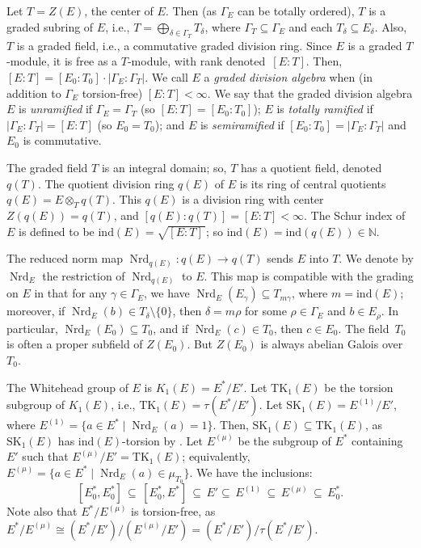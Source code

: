 \documentclass[11pt]{article}
\numberwithin{equation}{section}
\theoremstyle{plain}
\theoremstyle{remark}
\newcommand{\opn}{\operatorname}
\newcommand{\SK}{\opn{SK_1}}
\newcommand{\TK}{\opn{TK_1}}
\newcommand{\Emu}{E^{(\mu)}}
\newcommand{\Eone}{E^{(1)}}
\newcommand{\Nrd}{\opn{Nrd}}
\newcommand{\nn}{\mathbb N}
\begin{document}
Let $T = Z(E)$, the center of $E$. Then (as $\Gamma_E$ can be totally ordered), $T$ is a graded subring of 
$E$, i.e., $T = \bigoplus_{\delta\in \Gamma_T} T_\delta$, where $\Gamma_T \subseteq \Gamma _E$ and 
each $T_\delta \subseteq E_\delta$.  Also, $T$ is a graded field, i.e., a commutative graded division ring.
Since $E$ is a graded $T$-module, it is  free as a $T$-module, with rank denoted~$[E:T]$.   Then, 
$[E:T] = [E_0:T_0] \cdot |\Gamma_E:\Gamma_T|$.  
We call $E$ a {\it{graded division algebra}} when (in addition to $\Gamma_E$ torsion-free) $[E:T] < \infty$.
 We say that the graded division algebra $E$ is {\it{unramified}} if $\Gamma_E = \Gamma_T$ 
 (so $[E:T] = [E_0: T_0]$);  $E$ is {\it{totally ramified}} if $|\Gamma_E:\Gamma_T| = [E:T]$ (so $E_0 = T_0$); and 
$E$ is {\it{semiramified}} if $[E_0: T_0] = |\Gamma_E:\Gamma_T|$ and $E_0$ is commutative. 

The graded
field $T$ is an integral domain;  so, $T$ has a quotient field, denoted $q(T)$. 
The quotient division ring $q(E)$ of $E$ is its ring of central quotients $q(E) = E \otimes _T q(T)$.  This 
$q(E)$ is a division ring with center $Z(q(E)) = q(T)$, and $[q(E): q(T)] = [E:T] < \infty$. 
The Schur index of $E$ is defined to be $\text{ind}(E) = \sqrt{[E:T]\,}$; so $\text{ind}(E) = \text{ind} (q(E)) \in \nn$. 

The reduced norm map $\Nrd_{q(E)}\colon q(E) \to q(T)$ sends $E$ into $T$. We denote by $\Nrd_E$
the restriction of $\Nrd_{q(E)}$ to $E$.  This map is compatible with the grading  on $E$ in that for any
$\gamma\in\Gamma_E$, we have  $\Nrd_E(E_\gamma) \subseteq T_{m\gamma}$, where 
$m = \text{ind}(E)$; moreover, if $\Nrd_E(b) \in T_\delta \setminus\{0\}$, then $\delta = m\rho$ for some 
$\rho \in \Gamma_E$ and $b\in E_\rho$.  In particular, $\Nrd_E(E_0) \subseteq T_0$, and if $\Nrd_E(c) \in T_0$,
then $c\in E_0$.  The field~$T_0$ is often a proper subfield
of $Z(E_0)$.  But $Z(E_0)$ is always abelian Galois over $T_0$.

The Whitehead group of $E$ is $K_1(E) = E^*/E'$. Let $\TK(E)$ be the  torsion subgroup of $K_1(E)$,
i.e., $\TK(E) =\tau(E^*/E')$. Let $\SK(E) = \Eone/E'$, 
where $\Eone= \{ a \in E^*\mid \Nrd_E(a) = 1\}$.  Then, $\SK(E) \subseteq \TK(E)$, as $\SK(E)$ has 
$\text{ind}(E)$-torsion by 
\cite[Prop.~3.3(ii)]{hazrat-wadsworth-2011}.  Let $\Emu$ be the subgroup of $E^*$ containing $E'$ such that
$\Emu / E' = \TK(E)$; equivalently, ${\Emu = \{ a\in E^*\!\mid\! \Nrd_E(a) \in \mu_{T_0}\}}$.  We have the inclusions:
$$
[E_0^*, E_0^*] \, \subseteq \, [E_0^*, E^*] \, \subseteq \,E' \subseteq  \, \Eone \, \subseteq \,
\Emu\, \subseteq \, E_0^*.
$$
Note also that $E^*/\Emu$ is torsion-free, as  $E^*/\Emu \cong (E^*/E')\big/(\Emu/E') =
(E^*/E')\big/ \tau(E^*/E')$.
\end{document}
